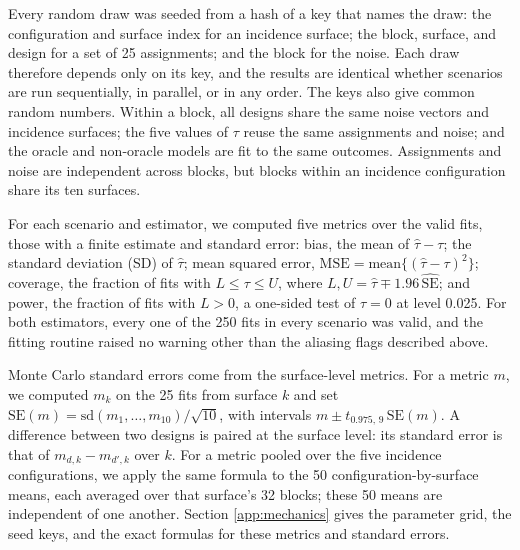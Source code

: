 \documentclass[11pt]{article}
\begin{document}
Every random draw was seeded from a hash of a key that names the draw:
the configuration and surface index for an incidence surface; the block,
surface, and design for a set of 25 assignments; and the block for the
noise. Each draw therefore depends only on its key, and the results are
identical whether scenarios are run sequentially, in parallel, or in any
order. The keys also give common random numbers. Within a block, all
designs share the same noise vectors and incidence surfaces; the five
values of \(\tau\) reuse the same assignments and noise; and the oracle
and non-oracle models are fit to the same outcomes. Assignments and
noise are independent across blocks, but blocks within an incidence
configuration share its ten surfaces.

For each scenario and estimator, we computed five metrics over the valid
fits, those with a finite estimate and standard error: bias, the mean of
\(\hat\tau - \tau\); the standard deviation (SD) of \(\hat\tau\); mean
squared error, \(\text{MSE} = \text{mean}\{(\hat\tau - \tau)^2\}\);
coverage, the fraction of fits with \(L \le \tau \le U\), where
\(L, U = \hat\tau \mp 1.96\,\widehat{\text{SE}}\); and power, the
fraction of fits with \(L > 0\), a one-sided test of \(\tau = 0\) at
level 0.025. For both estimators, every one of the 250 fits in every
scenario was valid, and the fitting routine raised no warning other than
the aliasing flags described above.

Monte Carlo standard errors come from the surface-level metrics. For a
metric \(m\), we computed \(m_k\) on the 25 fits from surface \(k\) and
set \(\text{SE}(m) = \text{sd}(m_1, \dots, m_{10})/\sqrt{10}\), with
intervals \(m \pm t_{0.975,\,9}\,\text{SE}(m)\). A difference between
two designs is paired at the surface level: its standard error is that
of \(m_{d,k} - m_{d',k}\) over \(k\). For a metric pooled over the five
incidence configurations, we apply the same formula to the 50
configuration-by-surface means, each averaged over that surface's 32
blocks; these 50 means are independent of one another. Section
\ref{app:mechanics} gives the parameter grid, the seed keys, and the
exact formulas for these metrics and standard errors.
\end{document}
